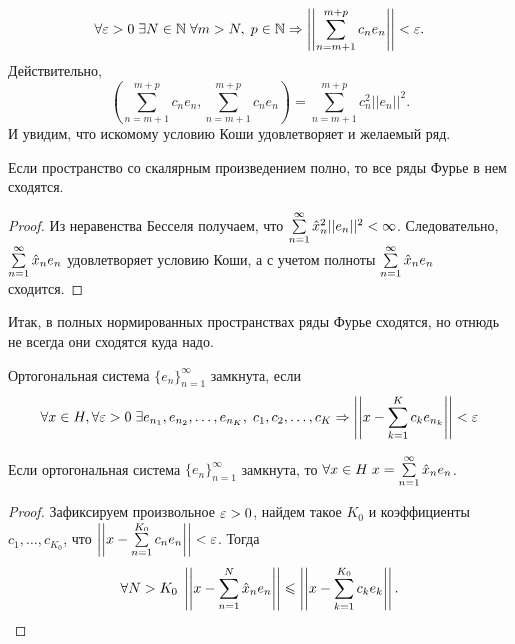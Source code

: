 \documentclass[a4paper, 12pt]{article}
\begin{document}
$$
    \forall \varepsilon>0\; \exists N\in \mathbb{N}\; \forall m>N,\; p\in \mathbb{N} \Rightarrow \left|\left|\sum\limits_{n=m+1}^{m+p}c_ne_n \right|\right| < \varepsilon.
$$
Действительно,
$$
    \left(\sum\limits_{n=m+1}^{m+p}c_ne_n, \sum\limits_{n=m+1}^{m+p}c_ne_n\right) =  \sum\limits_{n=m+1}^{m+p}c_n^2 ||e_n||^2.
$$
И увидим, что искомому условию Коши удовлетворяет и желаемый ряд.
\begin{Consequence}
    Если пространство со скалярным произведением полно, то все ряды Фурье в нем сходятся.
\end{Consequence}
\begin{proof}
    Из неравенства Бесселя получаем, что
    $\sum\limits_{n=1}^{\infty} \hat{x}_n^2 ||e_n||^2 < \infty$. Следовательно, $ \sum\limits_{n=1}^{\infty} \hat{x}_ne_n 
    $ удовлетворяет условию Коши, а с учетом полноты $\sum\limits_{n=1}^{\infty}\hat{x}_n e_n$ сходится.
\end{proof}
Итак, в полных нормированных пространствах ряды Фурье сходятся, но отнюдь не всегда они сходятся куда надо.
\begin{Def}
    Ортогональная система $\{e_n\}_{n=1}^{\infty}$ замкнута, если 
    $$\forall x\in H, \forall \varepsilon >0\; \exists e_{n_1}, e_{n_2}, \ldots, e_{n_K},\; c_1, c_2, \ldots, c_K \Rightarrow \left|\left|x - \sum\limits_{k=1}^{K} c_k e_{n_k}\right|\right|<\varepsilon
    $$
\end{Def}
\begin{Statement}
    Если ортогональная система $\{e_n\}_{n=1}^{\infty}$ замкнута, то $\forall x\in H\; x = \sum\limits_{n=1}^{\infty}\hat{x}_n e_{n}$.
\end{Statement}
\begin{proof}
    Зафиксируем произвольное $\varepsilon >0$, найдем такое $K_0$ и коэффициенты $c_1, \ldots, c_{K_0}$, что $\left|\left| x - \sum\limits_{n=1}^{K_0} c_ne_n \right|\right| < \varepsilon$. Тогда
    $$
        \forall N>K_0 \; \left|\left|x - \sum\limits_{n=1}^{N}\hat{x}_ne_n\right|\right|\leqslant \left|\left|x - \sum\limits_{k=1}^{K_0}c_ke_k \right|\right|.
    $$
\end{proof}
\end{document}

